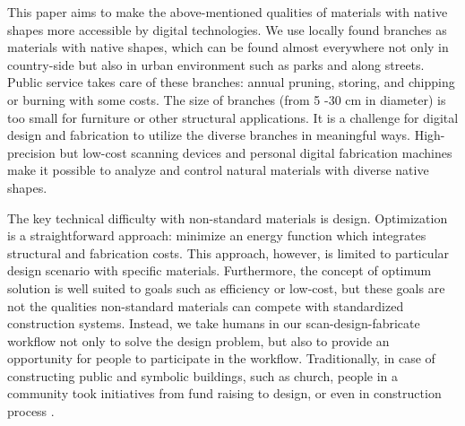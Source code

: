 This paper aims to make the above-mentioned qualities of materials with native shapes more accessible by digital technologies.
We use locally found branches as materials with native shapes, which can be found almost everywhere not only in country-side but also in urban environment such as parks and along streets.
Public service takes care of these branches: annual pruning, storing, and chipping or burning with some costs.
The size of branches (from 5 -30 cm in diameter) is too small for furniture or other structural applications.
It is a challenge for digital design and fabrication to utilize the diverse branches in meaningful ways.
High-precision but low-cost scanning devices and personal digital fabrication machines make it possible to analyze and control natural materials with diverse native shapes.

The key technical difficulty with non-standard materials is design.
Optimization is a straightforward approach: minimize an energy function which integrates structural and fabrication costs.
This approach, however, is limited to particular design scenario with specific materials.
Furthermore, the concept of optimum solution is well suited to goals such as efficiency or low-cost, but these goals are not the qualities non-standard materials can compete with standardized construction systems.
Instead, we take humans in our scan-design-fabricate workflow not only to solve the design problem, but also to provide an opportunity for people to participate in the workflow.
Traditionally, in case of constructing public and symbolic buildings, such as church, people in a community took initiatives from fund raising to design, or even in construction process \cite{}. 




